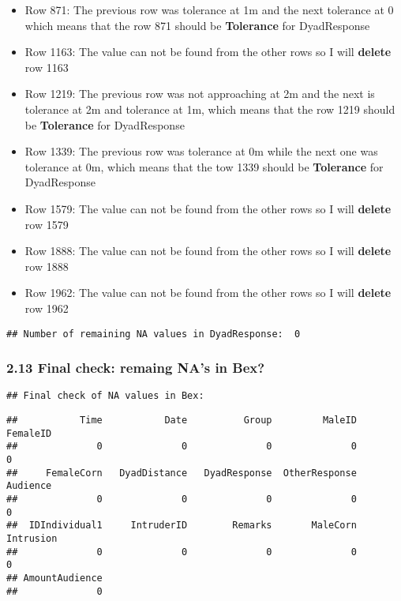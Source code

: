 \documentclass[
]{article}
\begin{document}
\begin{itemize}
\item
  Row 871: The previous row was tolerance at 1m and the next tolerance
  at 0 which means that the row 871 should be \textbf{Tolerance} for
  DyadResponse
\item
  Row 1163: The value can not be found from the other rows so I will
  \textbf{delete} row 1163
\item
  Row 1219: The previous row was not approaching at 2m and the next is
  tolerance at 2m and tolerance at 1m, which means that the row 1219
  should be \textbf{Tolerance} for DyadResponse
\item
  Row 1339: The previous row was tolerance at 0m while the next one was
  tolerance at 0m, which means that the tow 1339 should be
  \textbf{Tolerance} for DyadResponse
\item
  Row 1579: The value can not be found from the other rows so I will
  \textbf{delete} row 1579
\item
  Row 1888: The value can not be found from the other rows so I will
  \textbf{delete} row 1888
\item
  Row 1962: The value can not be found from the other rows so I will
  \textbf{delete} row 1962
\end{itemize}

\begin{verbatim}
## Number of remaining NA values in DyadResponse:  0
\end{verbatim}

\hypertarget{final-check-remaing-nas-in-bex}{%
\subsubsection{2.13 Final check: remaing NA's in
Bex?}\label{final-check-remaing-nas-in-bex}}

\begin{verbatim}
## Final check of NA values in Bex:
\end{verbatim}

\begin{verbatim}
##           Time           Date          Group         MaleID       FemaleID 
##              0              0              0              0              0 
##     FemaleCorn   DyadDistance   DyadResponse  OtherResponse       Audience 
##              0              0              0              0              0 
##  IDIndividual1     IntruderID        Remarks       MaleCorn      Intrusion 
##              0              0              0              0              0 
## AmountAudience 
##              0
\end{verbatim}
\end{document}
